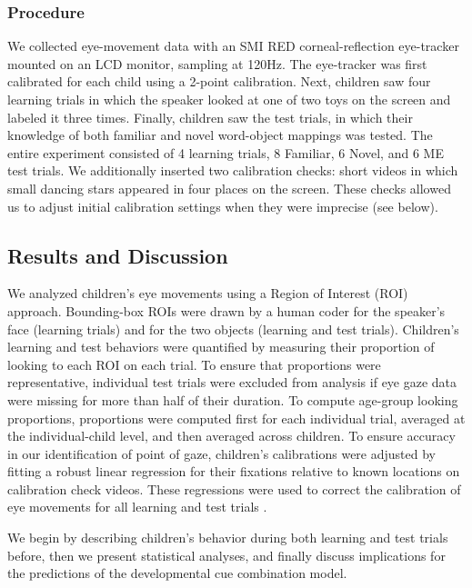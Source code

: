 \documentclass[man,floatsintext]{apa6}
\begin{document}
\subsubsection{Procedure}

We collected eye-movement data with an SMI RED corneal-reflection eye-tracker mounted on an LCD monitor, sampling at 120Hz. The eye-tracker was first calibrated for each child using a 2-point calibration. Next, children saw four learning trials in which the speaker looked at one of two toys on the screen and labeled it three times. Finally, children saw the test trials, in which their knowledge of both familiar and novel word-object mappings was tested. The entire experiment consisted of 4 learning trials, 8 Familiar, 6 Novel, and 6 ME test trials. We additionally inserted two calibration checks: short videos in which small dancing stars appeared in four places on the screen.  These checks allowed us to adjust initial calibration settings when they were imprecise (see below).

\subsection{Results and Discussion}

We analyzed children's eye movements using a Region of Interest (ROI) approach. Bounding-box ROIs were drawn by a human coder for the speaker's face (learning trials) and for the two objects (learning and test trials). Children's learning and test behaviors were quantified by measuring their proportion of looking to each ROI on each trial. To ensure that proportions were representative, individual test trials were excluded from analysis if eye gaze data were missing for more than half of their duration. To compute age-group looking proportions, proportions were computed first for each individual trial, averaged at the individual-child level, and then averaged across children. To ensure accuracy in our identification of point of gaze, children's calibrations were adjusted by fitting a robust linear regression for their fixations relative to known locations on calibration check videos. These regressions were used to correct the calibration of eye movements for all learning and test trials \cite{Frank2012d}.

We begin by describing children's behavior during both learning and test trials before, then we present statistical analyses, and finally discuss implications for the predictions of the developmental cue combination model. 
\end{document}
